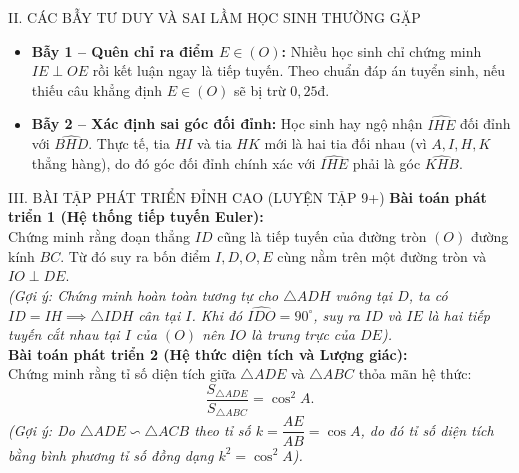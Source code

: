 \documentclass[11pt,a4paper]{article}
\begin{document}
\begin{pedagogybox}{II. CÁC BẪY TƯ DUY VÀ SAI LẦM HỌC SINH THƯỜNG GẶP}
\begin{itemize}[leftmargin=*, nosep]
    \item \textbf{Bẫy 1 -- Quên chỉ ra điểm $E \in (O)$:} Nhiều học sinh chỉ chứng minh $IE \perp OE$ rồi kết luận ngay là tiếp tuyến. Theo chuẩn đáp án tuyển sinh, nếu thiếu câu khẳng định $E \in (O)$ sẽ bị trừ $0{,}25$đ.
    \item \textbf{Bẫy 2 -- Xác định sai góc đối đỉnh:} Học sinh hay ngộ nhận $\widehat{IHE}$ đối đỉnh với $\widehat{BHD}$. Thực tế, tia $HI$ và tia $HK$ mới là hai tia đối nhau (vì $A, I, H, K$ thẳng hàng), do đó góc đối đỉnh chính xác với $\widehat{IHE}$ phải là góc $\widehat{KHB}$.
\end{itemize}
\end{pedagogybox}

\vspace{1mm}

\begin{exercisebox}{III. BÀI TẬP PHÁT TRIỂN ĐỈNH CAO (LUYỆN TẬP 9+)}
\textbf{Bài toán phát triển 1 (Hệ thống tiếp tuyến Euler):}\\
Chứng minh rằng đoạn thẳng $ID$ cũng là tiếp tuyến của đường tròn $(O)$ đường kính $BC$. Từ đó suy ra bốn điểm $I, D, O, E$ cùng nằm trên một đường tròn và $IO \perp DE$.\\[1mm]
\textit{(Gợi ý: Chứng minh hoàn toàn tương tự cho $\triangle ADH$ vuông tại $D$, ta có $ID = IH \implies \triangle IDH$ cân tại $I$. Khi đó $\widehat{IDO} = 90^\circ$, suy ra $ID$ và $IE$ là hai tiếp tuyến cắt nhau tại $I$ của $(O)$ nên $IO$ là trung trực của $DE$).}\\[2mm]
\textbf{Bài toán phát triển 2 (Hệ thức diện tích và Lượng giác):}\\
Chứng minh rằng tỉ số diện tích giữa $\triangle ADE$ và $\triangle ABC$ thỏa mãn hệ thức:
\[
\dfrac{S_{\triangle ADE}}{S_{\triangle ABC}} = \cos^2 A.
\]
\textit{(Gợi ý: Do $\triangle ADE \backsim \triangle ACB$ theo tỉ số $k = \dfrac{AE}{AB} = \cos A$, do đó tỉ số diện tích bằng bình phương tỉ số đồng dạng $k^2 = \cos^2 A$).}
\end{exercisebox}
\end{document}
